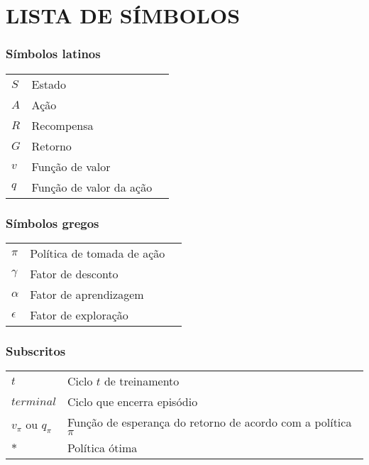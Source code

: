 




\chapter*{LISTA DE SÍMBOLOS}


\subsection*{Símbolos latinos}

\begin{tabular}{p{}p{}>{\PreserveBacklash\raggedleft}p{}}
	$S$ & Estado \tabularnewline
	$A$ & Ação \tabularnewline
	$R$ & Recompensa \tabularnewline
	$G$ & Retorno \tabularnewline
	$v$ & Função de valor \tabularnewline
	$q$ & Função de valor da ação\tabularnewline
 \end{tabular}

\subsection*{Símbolos gregos}

\begin{tabular}{p{}p{}>{\PreserveBacklash\raggedleft}p{}}
$\pi$ & Política de tomada de ação \tabularnewline
$\gamma$ & Fator de desconto \tabularnewline
$\alpha$ & Fator de aprendizagem \tabularnewline
$\epsilon$ & Fator de exploração \tabularnewline
\end{tabular}

\subsection*{Subscritos}

\begin{tabular}{p{}p{}}
$t$  & Ciclo $t$ de treinamento \tabularnewline
$terminal$  & Ciclo que encerra episódio \tabularnewline
$v_\pi$ ou  $q_\pi$ & Função de esperança do retorno de acordo com a política $\pi$ \tabularnewline
$*$  & Política ótima \tabularnewline
\end{tabular}

